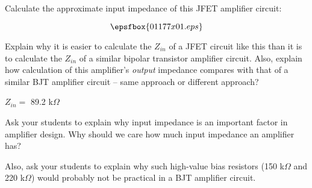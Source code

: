

Calculate the approximate input impedance of this JFET amplifier circuit:

$$\epsfbox{01177x01.eps}$$

Explain why it is easier to calculate the $Z_{in}$ of a JFET circuit like this than it is to calculate the $Z_{in}$ of a similar bipolar transistor amplifier circuit.  Also, explain how calculation of this amplifier's {\it output} impedance compares with that of a similar BJT amplifier circuit -- same approach or different approach?







$Z_{in} =$ 89.2 k$\Omega$







Ask your students to explain why input impedance is an important factor in amplifier design.  Why should we care how much input impedance an amplifier has?

Also, ask your students to explain why such high-value bias resistors (150 k$\Omega$ and 220 k$\Omega$) would probably not be practical in a BJT amplifier circuit.




